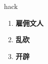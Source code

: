 
\begin{frame}
{\huge hack}
\begin{center}
\begin{enumerate}\Large
  \item \textbf{雇佣文人}
  \item \textbf{乱砍}
  \item \textbf{开辟}
\end{enumerate}
\end{center}
\end{frame}
